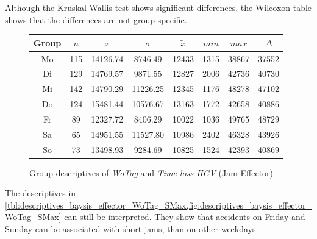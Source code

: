 Although the Kruskal-Wallis test shows significant differences, the Wilcoxon table shows that the differences are not group specific.
\begin{figure}[ht!]
	\centering
	\begin{minipage}{0.5\textwidth}
		\tiny
		\setlength{\tabcolsep}{4pt}
		\centering
		\begin{tabular}{c|c|c|c|c|c|c|c}
			\toprule
			Group & $n$ & $\bar{x}$ & $\sigma$ & $\tilde{x}$ & $min$ & $max$ & $\Delta$ \\
			\midrule
			Mo & 115 & 14126.74 & 8746.49  & 12433 & 1315 & 38867 & 37552 \\
			Di & 129 & 14769.57 & 9871.55  & 12827 & 2006 & 42736 & 40730 \\
			Mi & 142 & 14790.29 & 11226.25 & 12345 & 1176 & 48278 & 47102 \\
			Do & 124 & 15481.44 & 10576.67 & 13163 & 1772 & 42658 & 40886 \\
			Fr & 89  & 12327.72 & 8406.29  & 10022 & 1036 & 49765 & 48729 \\
			Sa & 65  & 14951.55 & 11527.80 & 10986 & 2402 & 46328 & 43926 \\
			So & 73  & 13498.93 & 9284.69  & 10825 & 1524 & 42393 & 40869 \\
			\bottomrule
		\end{tabular}
		\label{tbl:descriptives_baysis_effector_WoTag_SMax}
	\end{minipage}%
	\begin{minipage}{0.55\textwidth}
		\data
		\pgfplotstablesort[sort key=mean, sort cmp=float >]{\datasorted}{\data}
		\tiny
		\centering
		\label{fig:descriptives_baysis_effector_WoTag_SMax}
	\end{minipage}%
	\caption{Group descriptives of \textit{WoTag} and \textit{Time-loss HGV} (Jam Effector)}
\end{figure}
The descriptives in \cref{tbl:descriptives_baysis_effector_WoTag_SMax,fig:descriptives_baysis_effector_WoTag_SMax} can still be interpreted. They show that accidents on Friday and Sunday can be associated with short jams, than on other weekdays.

